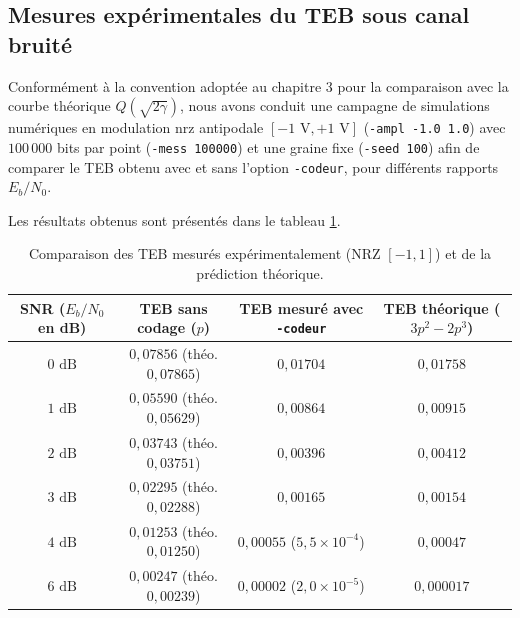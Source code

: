 \documentclass[a4paper,12pt]{report}
\begin{document}
\subsection{Mesures expérimentales du TEB sous canal bruité}

Conformément à la convention adoptée au chapitre 3 pour la comparaison avec la courbe théorique $Q(\sqrt{2\gamma})$, nous avons conduit une campagne de simulations numériques en modulation \gls{nrz} antipodale $[-1\text{ V}, +1\text{ V}]$ (\texttt{-ampl -1.0 1.0}) avec $100\,000$ bits par point (\texttt{-mess 100000}) et une graine fixe (\texttt{-seed 100}) afin de comparer le TEB obtenu avec et sans l'option \texttt{-codeur}, pour différents rapports $E_b/N_0$.

Les résultats obtenus sont présentés dans le tableau \ref{tab:resultats_mesures_teb}.

\begin{table}[H]
\centering
\begin{tabular}{|c|c|c|c|}
\hline
\textbf{SNR ($E_b/N_0$ en dB)} & \textbf{TEB sans codage ($p$)} & \textbf{TEB mesuré avec \texttt{-codeur}} & \textbf{TEB théorique ($3p^2 - 2p^3$)} \\
\hline
$0\text{ dB}$ & $0{,}07856$ (théo. $0{,}07865$) & $0{,}01704$ & $0{,}01758$ \\
$1\text{ dB}$ & $0{,}05590$ (théo. $0{,}05629$) & $0{,}00864$ & $0{,}00915$ \\
$2\text{ dB}$ & $0{,}03743$ (théo. $0{,}03751$) & $0{,}00396$ & $0{,}00412$ \\
$3\text{ dB}$ & $0{,}02295$ (théo. $0{,}02288$) & $0{,}00165$ & $0{,}00154$ \\
$4\text{ dB}$ & $0{,}01253$ (théo. $0{,}01250$) & $0{,}00055$ ($5{,}5 \times 10^{-4}$) & $0{,}00047$ \\
$6\text{ dB}$ & $0{,}00247$ (théo. $0{,}00239$) & $0{,}00002$ ($2{,}0 \times 10^{-5}$) & $0{,}000017$ \\
\hline
\end{tabular}
\caption{Comparaison des TEB mesurés expérimentalement (NRZ $[-1, 1]$) et de la prédiction théorique.}
\label{tab:resultats_mesures_teb}
\end{table}
\end{document}
